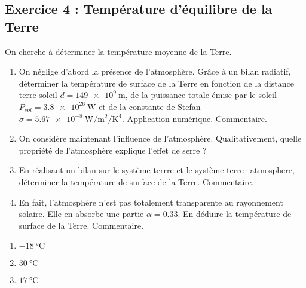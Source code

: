 \subsection{Exercice 4 : Température d'équilibre de la Terre}

On cherche à déterminer la température moyenne de la Terre.

\begin{enumerate}
	\item On néglige d'abord la présence de l'atmosphère. Grâce à un bilan radiatif, déterminer la température de surface de la Terre en fonction de la distance terre-soleil $d = \SI{149e9}{\meter}$, de la puissance totale émise par le soleil $P_{sol} = \SI{3.8e26}{\watt}$ et de la constante de Stefan $\sigma = \SI{5.67e-8}{\watt\per\meter\squared\per\kelvin\tothe{4}}$. Application numérique. Commentaire.
	\item On considère maintenant l'influence de l'atmosphère. Qualitativement, quelle propriété de l'atmosphère explique l'effet de serre ?
	\item En réalisant un bilan sur le système {terrre} et le système {terre+atmosphere}, déterminer la température de surface de la Terre. Commentaire.
	\item En fait, l'atmosphère n'est pas totalement transparente au rayonnement solaire. Elle en absorbe une partie $\alpha = 0.33$. En déduire la température de surface de la Terre. Commentaire.
\end{enumerate}

\begin{enumerate}
	\item $\SI{-18}{\degreeCelsius}$
	\item $\SI{30}{\degreeCelsius}$
	\item $\SI{17}{\degreeCelsius}$
\end{enumerate}